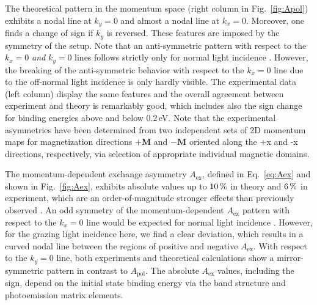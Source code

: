 \documentclass[prl,twocolumn,floatfix,superscriptaddress,aps]{revtex4-2}
\renewcommand{\vec}[1]{\boldsymbol{#1}}
\begin{document}
The theoretical pattern in the momentum space (right column in Fig.~\ref{fig:Apol}) exhibits a nodal line at $k_{y} = 0$ and almost a nodal line at $k_{x} = 0$. Moreover, one finds a change of sign if $k_{y}$ is reversed. These features are imposed by the symmetry of the setup. Note that an anti-symmetric pattern with respect to the $k_{x} = 0$ \textit{and} $k_{y} = 0$ lines follows strictly only for normal light incidence \cite{schumann2024}. However, the breaking of the anti-symmetric behavior with respect to the $k_{x} = 0$ line due to the off-normal light incidence is only hardly visible. The experimental data (left column) display the same features and the overall agreement between experiment and theory is remarkably good, which includes also the sign change for binding energies above and below 0.2\,eV. Note that the experimental asymmetries have been determined from two independent sets of 2D momentum maps for magnetization directions $+\vec{M}$ and $-\vec{M}$ oriented along the +x and -x directions, respectively, via selection of appropriate individual magnetic domains.

The momentum-dependent exchange asymmetry $A_{\mathrm{ex}}$, defined in Eq.~\eqref{eq:Aex} and shown in Fig.~\ref{fig:Aex}, exhibits absolute values up to $\unit[10]{\%}$ in theory and $\unit[6]{\%}$ in experiment, which are an order-of-magnitude stronger effects than previously observed \cite{marx2000}. An odd symmetry of the momentum-dependent $A_{\mathrm{ex}}$ pattern with respect to the $k_{x} = 0$ line would be expected for normal light incidence \cite{schumann2024}. However, for the grazing light incidence here, we find a clear deviation, which results in a curved nodal line between the regions of positive and negative $A_{\mathrm{ex}}$. With respect to the $k_{y} = 0$ line, both experiments and theoretical calculations show a mirror-symmetric pattern in contrast to $A_{\mathrm{pol}}$. The absolute $A_{\mathrm{ex}}$ values, including the sign, depend on the initial state binding energy via the band structure and photoemission matrix elements.
\end{document}
